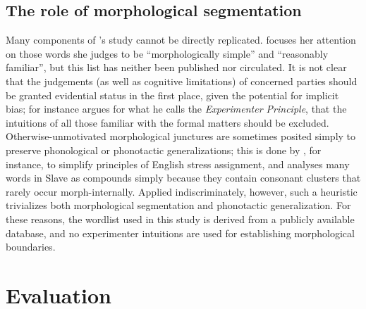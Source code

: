\subsection{The role of morphological segmentation}

Many components of \citeauthor{Pierrehumbert1994}'s study cannot be directly replicated. \citeauthor{Pierrehumbert1994} focuses her attention on those words she judges to be ``morphologically simple'' and ``reasonably familiar'', but this list has neither been published nor circulated.
It is not clear that the judgements (as well as cognitive limitations) of concerned parties should be granted evidential status in the first place, given the potential for implicit bias; 
\citet{Labov1975} for instance
argues for what he calls the \emph{Experimenter Principle}, 
that the intuitions of all those familiar with the formal matters should be excluded.
Otherwise-unmotivated morphological junctures are sometimes posited simply to preserve phonological or phonotactic generalizations; 
this is done by \citet{SPE}, for instance, to simplify principles of English stress assignment, and \citet[546]{Rice2009d} analyses many words in Slave as compounds simply because they contain consonant clusters that rarely occur morph-internally. 
Applied indiscriminately, however, such a heuristic trivializes both morphological segmentation and phonotactic generalization.
For these reasons, the wordlist used in this study is derived from a publicly available database, and no experimenter intuitions are used for establishing morphological boundaries.


\section{Evaluation}
\label{4evaluation}

